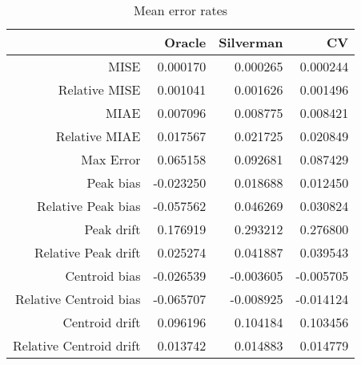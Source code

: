 \begin{table}[ht]
\centering
\begin{tabular}{rrrr}
  \hline
 & Oracle & Silverman & CV \\ 
  \hline
MISE & 0.000170 & 0.000265 & 0.000244 \\ 
  Relative MISE & 0.001041 & 0.001626 & 0.001496 \\ 
  MIAE & 0.007096 & 0.008775 & 0.008421 \\ 
  Relative MIAE & 0.017567 & 0.021725 & 0.020849 \\ 
  Max Error & 0.065158 & 0.092681 & 0.087429 \\ 
  Peak bias & -0.023250 & 0.018688 & 0.012450 \\ 
  Relative Peak bias & -0.057562 & 0.046269 & 0.030824 \\ 
  Peak drift & 0.176919 & 0.293212 & 0.276800 \\ 
  Relative Peak drift & 0.025274 & 0.041887 & 0.039543 \\ 
  Centroid bias & -0.026539 & -0.003605 & -0.005705 \\ 
  Relative Centroid bias & -0.065707 & -0.008925 & -0.014124 \\ 
  Centroid drift & 0.096196 & 0.104184 & 0.103456 \\ 
  Relative Centroid drift & 0.013742 & 0.014883 & 0.014779 \\ 
   \hline
\end{tabular}
\caption{Mean error rates} 
\label{tbl:mean_error_rates}
\end{table}
